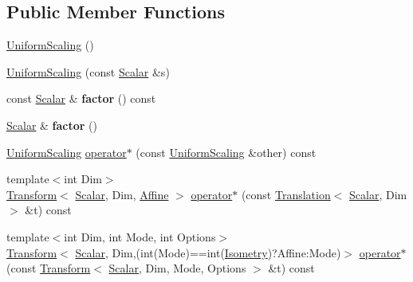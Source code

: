 \subsection*{Public Member Functions}
\begin{DoxyCompactItemize}
\item 
\hyperlink{class_eigen_1_1_uniform_scaling_ab17e233af501c69ff47c0dd16f43cc39}{Uniform\+Scaling} ()
\item 
\hyperlink{class_eigen_1_1_uniform_scaling_a3a3e2fa318eb29c2c4f87e23a8a75144}{Uniform\+Scaling} (const \hyperlink{class_eigen_1_1_uniform_scaling_a04c4339f58f1210c5d4d34b1bd7ae283}{Scalar} \&s)
\item 
\mbox{\label{class_eigen_1_1_uniform_scaling_a600949d7c5ed124adacaba53b631b6e6}} 
const \hyperlink{class_eigen_1_1_uniform_scaling_a04c4339f58f1210c5d4d34b1bd7ae283}{Scalar} \& {\bfseries factor} () const
\item 
\mbox{\label{class_eigen_1_1_uniform_scaling_a380501e65319cfa832da20730f0bf122}} 
\hyperlink{class_eigen_1_1_uniform_scaling_a04c4339f58f1210c5d4d34b1bd7ae283}{Scalar} \& {\bfseries factor} ()
\item 
\hyperlink{class_eigen_1_1_uniform_scaling}{Uniform\+Scaling} \hyperlink{class_eigen_1_1_uniform_scaling_af3044cffe5703a1946c33a953b0f9bb6}{operator$\ast$} (const \hyperlink{class_eigen_1_1_uniform_scaling}{Uniform\+Scaling} \&other) const
\item 
{\footnotesize template$<$int Dim$>$ }\\\hyperlink{group___geometry___module_class_eigen_1_1_transform}{Transform}$<$ \hyperlink{class_eigen_1_1_uniform_scaling_a04c4339f58f1210c5d4d34b1bd7ae283}{Scalar}, Dim, \hyperlink{group__enums_ggaee59a86102f150923b0cac6d4ff05107a71e768e0581725d919d0b05f4cb83234}{Affine} $>$ \hyperlink{class_eigen_1_1_uniform_scaling_a19c405341f2c861eb0ddfc4f760fecf8}{operator$\ast$} (const \hyperlink{group___geometry___module_class_eigen_1_1_translation}{Translation}$<$ \hyperlink{class_eigen_1_1_uniform_scaling_a04c4339f58f1210c5d4d34b1bd7ae283}{Scalar}, Dim $>$ \&t) const
\item 
{\footnotesize template$<$int Dim, int Mode, int Options$>$ }\\\hyperlink{group___geometry___module_class_eigen_1_1_transform}{Transform}$<$ \hyperlink{class_eigen_1_1_uniform_scaling_a04c4339f58f1210c5d4d34b1bd7ae283}{Scalar}, Dim,(int(Mode)==int(\hyperlink{group__enums_ggaee59a86102f150923b0cac6d4ff05107a080cd5366173608f701cd945c2335568}{Isometry})?Affine\+:\+Mode)$>$ \hyperlink{class_eigen_1_1_uniform_scaling_a0fc239af586bb24d7db99c6b8ce42373}{operator$\ast$} (const \hyperlink{group___geometry___module_class_eigen_1_1_transform}{Transform}$<$ \hyperlink{class_eigen_1_1_uniform_scaling_a04c4339f58f1210c5d4d34b1bd7ae283}{Scalar}, Dim, Mode, Options $>$ \&t) const

\end{DoxyCompactItemize}
